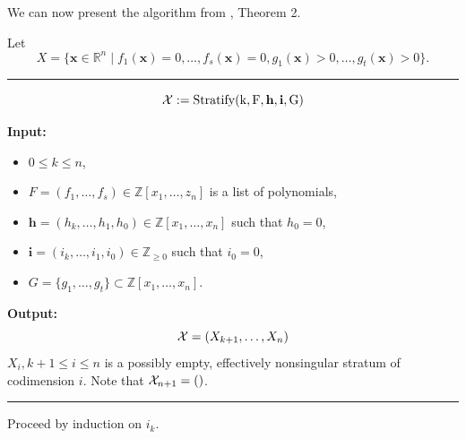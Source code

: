 \documentclass[
]{book}
\providecommand{\tightlist}{%
  \setlength{\itemsep}{0pt}\setlength{\parskip}{0pt}}
\theoremstyle{definition}
\theoremstyle{definition}
\theoremstyle{definition}
\theoremstyle{definition}
\theoremstyle{remark}
\begin{document}
We can now present the algorithm from \citet{gv1995}, Theorem 2.

Let \[
X = \{ \mathbf{x} \in \mathbb{R}^n \mid f_1(\mathbf{x}) = 0,\ldots,f_s(\mathbf{x}) = 0, g_1(\mathbf{x}) > 0, \ldots, g_t(\mathbf{x}) > 0 \}.
\]

\begin{center}\rule{0.5\linewidth}{0.5pt}\end{center}

\[{\cal X} := \rm{Stratify}(k, F, \mathbf{h}, \mathbf{i}, G)\]

\textbf{Input:}

\begin{itemize}
\tightlist
\item
  \(0 \le k \le n\),
\item
  \(F = (f_1,\ldots,f_s) \in \mathbb{Z}[x_1,\ldots,z_n]\) is a list of polynomials,
\item
  \(\mathbf{h} = (h_k, \ldots,h_1, h_0) \in \mathbb{Z}[x_1,\ldots,x_n]\) such that \(h_0 = 0\),
\item
  \(\mathbf{i} = (i_k, \ldots, i_1,i_0) \in \mathbb{Z}_{\ge 0}\) such that \(i_0 = 0\),
\item
  \(G = \{g_1,\ldots,g_t\} \subset \mathbb{Z}[x_1,\ldots,x_n]\).
\end{itemize}

\textbf{Output:}
\[
{\cal X} = (X_{k+1}, \ldots, X_n)
\]
\(X_i, k+1 \le i \le n\) is a possibly empty, effectively nonsingular stratum of codimension \(i\).
Note that \({\cal X}_{n+1} = ()\).

\begin{center}\rule{0.5\linewidth}{0.5pt}\end{center}

Proceed by induction on \(i_k\).
\end{document}
